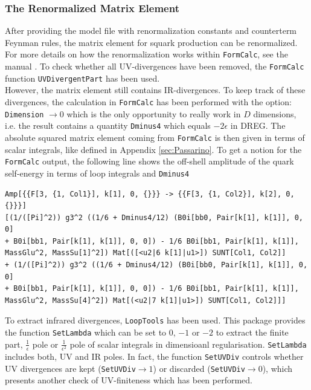 \subsubsection{The Renormalized Matrix Element}
After providing the model file with renormalization constants and counterterm Feynman rules, the matrix element for squark production can be renormalized. For more details on how the renormalization works within \texttt{FormCalc}, see the manual \cite{FormCalcManual}.
To check whether all UV-divergences have been removed, the \texttt{FormCalc} function \texttt{UVDivergentPart} has been used.\\
However, the matrix element still contains IR-divergences. To keep track of these divergences, the calculation in \texttt{FormCalc} has been performed with the option: \texttt{Dimension} $\to 0$ which is the only opportunity to really work in $D$ dimensions, i.e. the result contains a quantity \texttt{Dminus4} which equals $-2\epsilon$ in DREG. The absolute squared matrix element coming from \texttt{FormCalc} is then given in terms of scalar integrals, like defined in Appendix \ref{sec:Passarino}. To get a notion for the \texttt{FormCalc} output, the following line shows the off-shell amplitude of the quark self-energy in terms of loop integrals and \texttt{Dminus4}
\begin{lstlisting}[style=MyMathematicaOutput]
Amp[{{F[3, {1, Col1}], k[1], 0, {}}} -> {{F[3, {1, Col2}], k[2], 0, {}}}]
[(1/([Pi]^2)) g3^2 ((1/6 + Dminus4/12) (B0i[bb0, Pair[k[1], k[1]], 0, 0] 
+ B0i[bb1, Pair[k[1], k[1]], 0, 0]) - 1/6 B0i[bb1, Pair[k[1], k[1]], MassGlu^2, MassSu[1]^2]) Mat[([<u2|6 k[1]|u1>]) SUNT[Col1, Col2]] 
+ (1/([Pi]^2)) g3^2 ((1/6 + Dminus4/12) (B0i[bb0, Pair[k[1], k[1]], 0, 0] 
+ B0i[bb1, Pair[k[1], k[1]], 0, 0]) - 1/6 B0i[bb1, Pair[k[1], k[1]], MassGlu^2, MassSu[4]^2]) Mat[(<u2|7 k[1]|u1>]) SUNT[Col1, Col2]]]
\end{lstlisting}
To extract infrared divergences, \texttt{LoopTools} has been used. This package provides the function \texttt{SetLambda} which can be set to 0, $-1$ or $-2$ to extract the finite part, $\frac{1}{\epsilon}$ pole or $\frac{1}{\epsilon^2}$ pole of scalar integrals in dimensioanl regularisation. \texttt{SetLambda} includes both, UV and IR poles. In fact, the function \texttt{SetUVDiv} controls whether UV divergences are kept (\texttt{SetUVDiv}$\to 1$) or discarded (\texttt{SetUVDiv}$\to 0$), which presents another check of UV-finiteness which has been performed.\\

